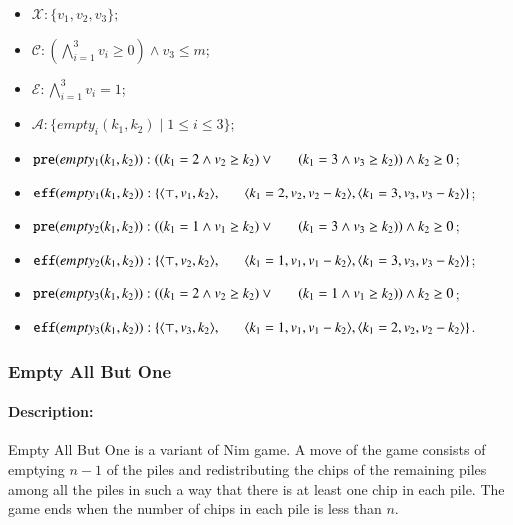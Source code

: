 \documentclass[review]{elsarticle}
\newcommand{\set}[1]{\{ #1 \}}
\newcommand{\tuple}[1]{\langle {#1} \rangle}
\newcommand{\true}{\top}
\newcommand{\statevar}{\mathcal{X}}
\newcommand{\act}{\mathcal{A}}
\newcommand{\constraint}{\mathcal{C}}
\newcommand{\estate}{\mathcal{E}}
\newcommand{\pre}{\mathtt{pre}}
\newcommand{\eff}{\mathtt{eff}}
\begin{document}
\begin{itemize}
	\item $\statevar: \set{v_1, v_2, v_3}$;
	\item $\constraint: (\bigwedge_{i=1}^{3} v_i \ge 0) \wedge v_3 \le m$;
	\item $\estate: \bigwedge_{i=1}^{3} v_i = 1$;
	\item $\act:\set{empty_i(k_1, k_2)\mid 1\le i\le 3}$;
	\item $\pre(empty_1(k_1, k_2)) : ((k_1 =2 \wedge v_2 \ge k_2) \vee\\
	\hspace*{6mm}(k_1=3 \wedge v_3 \ge k_2)) \wedge k_2\ge 0$;
	\item $\eff(empty_1(k_1, k_2)) : \set{\tuple{\true, v_1, k_2}, \\
		\hspace*{6mm}\tuple{k_1=2, v_2, v_2 - k_2}, \tuple{k_1=3, v_3, v_3 - k_2}}$;
	\item $\pre(empty_2(k_1, k_2)) : ((k_1 =1 \wedge v_1 \ge k_2) \vee\\
	\hspace*{6mm}(k_1=3 \wedge v_3 \ge k_2)) \wedge k_2\ge 0$;
	\item $\eff(empty_2(k_1, k_2)) : \set{\tuple{\true, v_2, k_2}, \\
		\hspace*{6mm} \tuple{k_1=1, v_1, v_1 - k_2}, \tuple{k_1=3, v_3, v_3 - k_2}}$;
	\item $\pre(empty_3(k_1, k_2)) : ((k_1 =2 \wedge v_2 \ge k_2) \vee \\
	\hspace*{6mm}(k_1=1 \wedge v_1 \ge k_2)) \wedge k_2\ge 0$;
	\item $\eff(empty_3(k_1, k_2)) : \set{\tuple{\true, v_3, k_2},\\
		\hspace*{6mm}\tuple{k_1=1, v_1, v_1 - k_2}, \tuple{k_1=2, v_2, v_2 - k_2}}$.
\end{itemize}




\subsubsection{Empty All But One \protect\cite{Fer1998}}
\paragraph{Description:}
Empty All But One is a variant of Nim game.
A move of the game consists of emptying $n - 1$ of the piles and redistributing the chips of the remaining piles among all the piles in such a way that there is at least one chip in each pile.
The game ends when the number of chips in each pile is less than $n$. 
\end{document}
